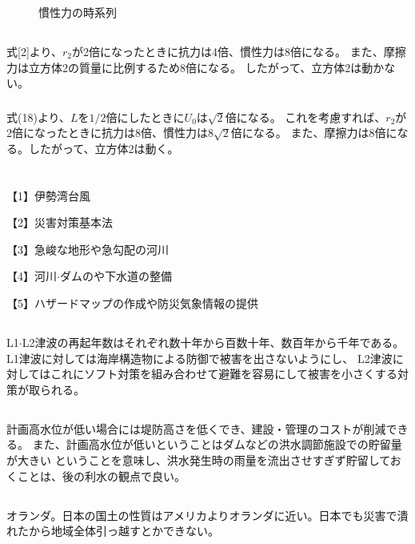 \documentclass[a4paper]{jsarticle}
\begin{document}
\begin{figure}[htb]
\begin{minipage}{0.3\hsize}
    \caption{慣性力の時系列}
  \end{minipage}
\end{figure}

\subsection{}
\subsubsection{}
式[2]より、$r_2$が2倍になったときに抗力は4倍、慣性力は8倍になる。
また、摩擦力は立方体2の質量に比例するため8倍になる。
したがって、立方体2は動かない。

\subsubsection{}
式(18)より、$L$を$1/2$倍にしたときに$U_0$は$\sqrt{2}$倍になる。
これを考慮すれば、$r_2$が2倍になったときに抗力は8倍、慣性力は$8\sqrt{2}$倍になる。
また、摩擦力は8倍になる。したがって、立方体2は動く。

\section{}
\subsection{}
【1】伊勢湾台風 \par
【2】災害対策基本法 \par
【3】急峻な地形や急勾配の河川 \par
【4】河川$\cdot$ダムのや下水道の整備 \par
【5】ハザードマップの作成や防災気象情報の提供

\subsection{}
L1$\cdot$L2津波の再起年数はそれぞれ数十年から百数十年、数百年から千年である。
L1津波に対しては海岸構造物による防御で被害を出さないようにし、
L2津波に対してはこれにソフト対策を組み合わせて避難を容易にして被害を小さくする対策が取られる。

\subsection{}
計画高水位が低い場合には堤防高さを低くでき、建設・管理のコストが削減できる。
また、計画高水位が低いということはダムなどの洪水調節施設での貯留量が大きい
ということを意味し、洪水発生時の雨量を流出させすぎず貯留しておくことは、後の利水の観点で良い。

\subsection{}
オランダ。日本の国土の性質はアメリカよりオランダに近い。日本でも災害で潰れたから地域全体引っ越すとかできない。
\end{document}
